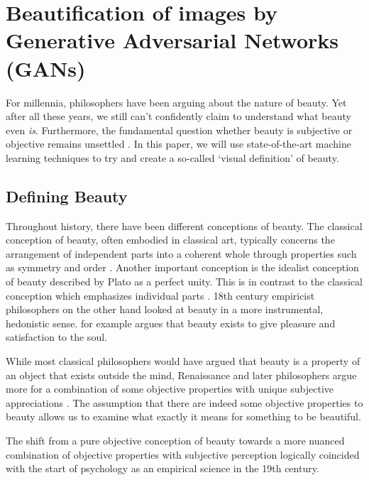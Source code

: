 \documentclass[../main.tex]{subfiles}
\begin{document}
\section{Beautification of images by Generative Adversarial Networks (GANs)}
For millennia, philosophers have been arguing about the nature of beauty. Yet after all these years, we still can't confidently claim to understand what beauty even \textit{is}. Furthermore, the fundamental question whether beauty is subjective or objective remains unsettled \parencite{sep-beauty}. In this paper, we will use state-of-the-art machine learning techniques to try and create a so-called `visual definition' of beauty.


\subsection{Defining Beauty}
Throughout history, there have been different conceptions of beauty. The classical conception of beauty, often embodied in classical art, typically concerns the arrangement of independent parts into a coherent whole through properties such as symmetry and order \parencite{wolfflin1932principles, sep-beauty}. Another important conception is the idealist conception of beauty described by Plato as a perfect unity. This is in contrast to the classical conception which emphasizes individual parts \parencite{sep-beauty}. 18th century empiricist philosophers on the other hand looked at beauty in a more instrumental, hedonistic sense. \textcite{hume2003treatise} for example argues that beauty exists to give pleasure and satisfaction to the soul.

While most classical philosophers would have argued that beauty is a property of an object that exists outside the mind, Renaissance and later philosophers argue more for a combination of some objective properties with unique subjective appreciations \parencite{sartwell2017entanglements}. The assumption that there are indeed some objective properties to beauty allows us to examine what exactly it means for something to be beautiful.





The shift from a pure objective conception of beauty towards a more nuanced combination of objective properties with subjective perception logically coincided with the start of psychology as an empirical science in the 19th century. 
\end{document}
